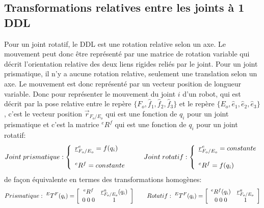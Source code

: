 \subsection{Transformations relatives entre les joints à 1 DDL}
%
Pour un joint rotatif, le DDL est une rotation relative selon un axe. Le mouvement peut donc être représenté par une matrice de rotation variable qui décrit l'orientation relative des deux liens rigides reliés par le joint. Pour un joint prismatique, il n'y a aucune rotation relative, seulement une translation selon un axe. Le mouvement est donc représenté par un vecteur position de longueur variable. Donc pour représenter le mouvement du joint $i$ d'un robot, qui est décrit par la pose relative entre le repère $\{F_o, \hat{f}_1, \hat{f}_2, \hat{f}_3\}$ et le repère $\{E_o, \hat{e}_1, \hat{e}_2, \hat{e}_3\}$, c'est le vecteur position $\vec{r}_{F_o/E_o}$ qui est une fonction de $q_i$ pour un joint prismatique et c'est la matrice $^{e}R^f$ qui est une fonction de $q_i$ pour un joint rotatif:
\begin{align}
	Joint\;prismatique:
	\left\{
	\begin{array}{l}
		\underline{r}_{F_o/E_o}^e = f( q_i )
		\\ \\
		^{e}R^f = constante
	\end{array} \right.
	\quad\quad
	Joint\;rotatif:
	\left\{
	\begin{array}{l}
		\underline{r}_{F_o/E_o}^e = constante
		\\ \\
		^{e}R^f = f( q_i )
	\end{array} \right.
\end{align}
de façon équivalente en termes des transformations homogènes:
\begin{align}
	Prismatique: \;
	^{E}T^F( q_i ) = \left[ \begin{array}{c c}
								^{e}R^f  & \underline{r}_{F_o/E_o}^a( q_i )  \\ 0 \; 0 \; 0 & 1
	\end{array}  \right]
	\quad\quad
	Rotatif: \;
	^{E}T^F( q_i ) = \left[ \begin{array}{c c}
								^{e}R^f( q_i )  & \underline{r}_{F_o/E_o}^a  \\ 0 \; 0 \; 0 & 1
	\end{array}  \right]
\end{align}



